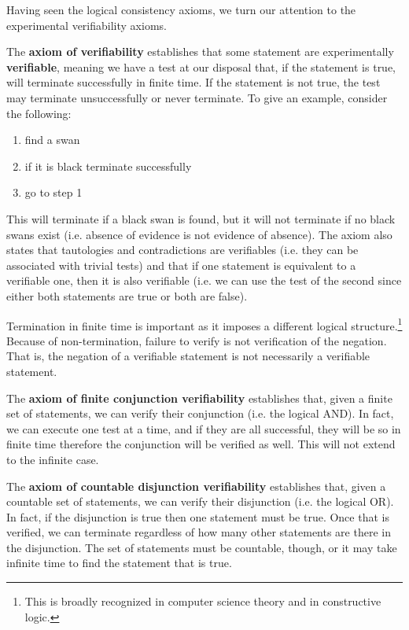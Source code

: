 \documentclass[twocolumn]{article}
\begin{document}
Having seen the logical consistency axioms, we turn our attention to the experimental verifiability axioms.

The \textbf{axiom of verifiability} establishes that some statement are experimentally \textbf{verifiable}, meaning we have a test at our disposal that, if the statement is true, will terminate successfully in finite time. If the statement is not true, the test may terminate unsuccessfully or never terminate. To give an example, consider the following:
\begin{enumerate}
	\item find a swan
	\item if it is black terminate successfully
	\item go to step 1
\end{enumerate}
This will terminate if a black swan is found, but it will not terminate if no black swans exist (i.e. absence of evidence is not evidence of absence). The axiom also states that tautologies and contradictions are verifiables (i.e. they can be associated with trivial tests) and that if one statement is equivalent to a verifiable one, then it is also verifiable (i.e. we can use the test of the second since either both statements are true or both are false).

Termination in finite time is important as it imposes a different logical structure.\footnote{This is broadly recognized in computer science theory and in constructive logic.} Because of non-termination, failure to verify is not verification of the negation. That is, the negation of a verifiable statement is not necessarily a verifiable statement.

The \textbf{axiom of finite conjunction verifiability} establishes that, given a finite set of statements, we can verify their conjunction (i.e. the logical AND). In fact, we can execute one test at a time, and if they are all successful, they will be so in finite time therefore the conjunction will be verified as well. This will not extend to the infinite case.

The \textbf{axiom of countable disjunction verifiability} establishes that, given a countable set of statements, we can verify their disjunction (i.e. the logical OR). In fact, if the disjunction is true then one statement must be true. Once that is verified, we can terminate regardless of how many other statements are there in the disjunction. The set of statements must be countable, though, or it may take infinite time to find the statement that is true.
\end{document}
